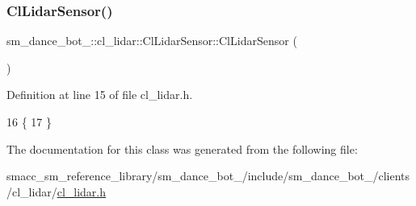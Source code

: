 \subsubsection{\texorpdfstring{Cl\+Lidar\+Sensor()}{ClLidarSensor()}}
{\footnotesize\ttfamily sm\+\_\+dance\+\_\+bot\+\_\+::cl\+\_\+lidar\+::\+Cl\+Lidar\+Sensor\+::\+Cl\+Lidar\+Sensor (\begin{DoxyParamCaption}{ }\end{DoxyParamCaption})\hspace{0.3cm}{\ttfamily [inline]}}



Definition at line 15 of file cl\+\_\+lidar.\+h.


\begin{DoxyCode}
16     \{
17     \}
\end{DoxyCode}


The documentation for this class was generated from the following file\+:\begin{DoxyCompactItemize}
\item 
smacc\+\_\+sm\+\_\+reference\+\_\+library/sm\+\_\+dance\+\_\+bot\+\_/include/sm\+\_\+dance\+\_\+bot\+\_/clients/cl\+\_\+lidar/\hyperlink{2_2include_2sm__dance__bot__2_2clients_2cl__lidar_2cl__lidar_8h}{cl\+\_\+lidar.\+h}\end{DoxyCompactItemize}
